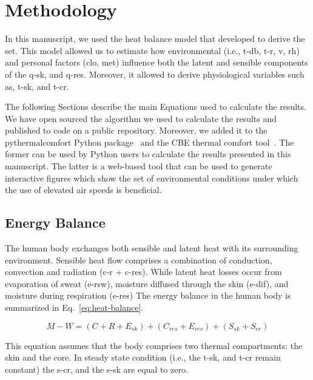 
\section{Methodology}\label{sec:methodology}

In this manuscript, we used the heat balance model that  developed to derive the \ac{set}.
This model allowed us to estimate how environmental (i.e., \ac{t-db}, \ac{t-r}, \ac{v}, \ac{rh}) and personal factors (\ac{clo}, \ac{met}) influence both the latent and sensible components of the \ac{q-sk}, and \ac{q-res}.
Moreover, it allowed to derive physiological variables such as, \ac{t-sk}, and \ac{t-cr}.

The following Sections describe the main Equations used to calculate the results.
We have open sourced the algorithm we used to calculate the results and published to code on a public repository.
Moreover, we added it to the pythermalcomfort Python package~\cite{Tartarini2020a} and the CBE thermal comfort tool~\cite{Tartarini2020}.
The former can be used by Python users to calculate the results presented in this manuscript.
The latter is a web-based tool that can be used to generate interactive figures which show the set of environmental conditions under which the use of elevated air speeds is beneficial.

\subsection{Energy Balance}\label{subsec:energy-balance}

The human body exchanges both sensible and latent heat with its surrounding environment.
Sensible heat flow comprises a combination of conduction, convection and radiation (\acs{c-r} + \acs{c-res}).
While latent heat losses occur from evaporation of sweat  (\acs{e-rsw}), moisture diffused through the skin  (\acs{e-dif}), and moisture during respiration (\acs{e-res})
The energy balance in the human body is summarized in Eq.~\ref{eq:heat-balance}.

\begin{equation}
    M - W = (C + R + E_{sk}) + (C_{res} + E_{res}) + (S_{sk} + S_{cr})\label{eq:heat-balance}
\end{equation}

This equation assumes that the body comprises two thermal compartments: the skin and the core.
In steady state condition (i.e., the \ac{t-sk}, and \ac{t-cr} remain constant) the \ac{s-cr}, and the \ac{s-sk} are equal to zero.

